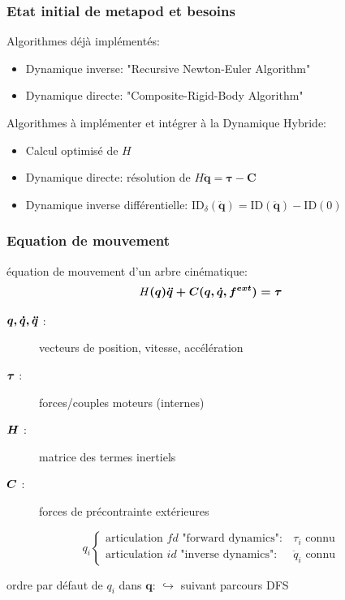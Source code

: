 \documentclass[10pt]{beamer}
\begin{document}
\begin{frame}
  \frametitle{Etat initial de metapod et besoins}
 
  Algorithmes déjà implémentés:
  \begin{itemize}
  \item Dynamique inverse:	"Recursive Newton-Euler Algorithm"
  \item Dynamique directe:	"Composite-Rigid-Body Algorithm"
  \end{itemize}
  \bigskip
  Algorithmes à implémenter et intégrer à la Dynamique Hybride:
  \begin{itemize}
  \item Calcul optimisé de $H$
  \item Dynamique directe:	résolution de $H \boldsymbol{\ddot{q} = \tau - C}$
  \item Dynamique inverse différentielle: $\mathrm{ID}_{\delta}(\boldsymbol{\ddot{q}}) = \mathrm{ID}(\boldsymbol{\ddot{q}}) - \mathrm{ID}(0)$
  \end{itemize}
  
\end{frame}

\begin{frame}

  \frametitle{Equation de mouvement}
  
  \begin{block}{équation de mouvement d'un arbre cinématique:}
  \begin{equation} \label{equ_equationMvt}
	H\boldsymbol{(q) \ddot{q} + C(q,\dot{q},f^{ext}) = \tau}
	\end{equation}
  \end{block}
  
  \begin{description}
    \item[$\boldsymbol{q, \dot{q}, \ddot{q}}$ :] vecteurs de position, vitesse, accélération
    \item[$\boldsymbol{\tau}$ :] forces/couples moteurs (internes)
    \item[$\boldsymbol{H}$ :] matrice des termes inertiels
    \item[$\boldsymbol{C}$ :] forces de précontrainte extérieures
  \end{description}
  
  \begin{equation*}
  q_i
  \begin{cases}
  \text{articulation $fd$ "forward dynamics"}: &\tau_i \text{ connu} \\
  \text{articulation $id$ "inverse dynamics"}: &\ddot{q}_i \text{ connu}
  \end{cases}
  \end{equation*}
  
  ordre par défaut de $q_i$ dans $\boldsymbol{q}$:
  $\hookrightarrow$ suivant parcours DFS
  

\end{frame}
\end{document}
